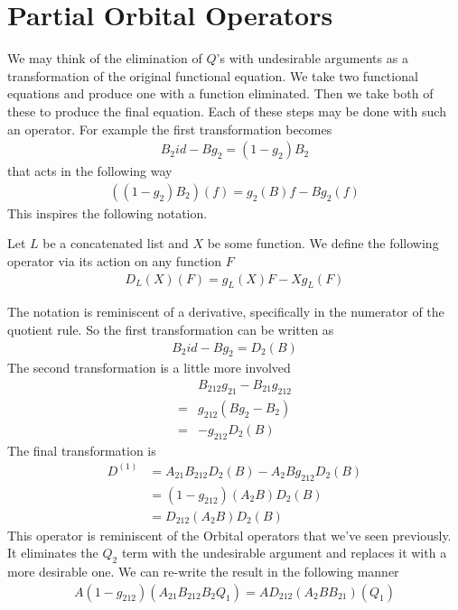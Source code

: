 \section{Partial Orbital Operators}
We may think of the elimination of $Q$'s with undesirable arguments as a transformation of the original functional equation. We take two functional equations and produce one with a function eliminated. Then we take both of these to produce the final equation. Each of these steps may be done with such an operator. For example the first transformation becomes
\begin{align}
	B_2 id - B g_2 = (1-g_2)B_2
\end{align}
that acts in the following way
\begin{align}
	 ((1-g_2)B_2)(f) = g_2(B)f - B g_2(f)
\end{align}
This inspires the following notation.
\begin{definition} Let $L$ be a concatenated list and $X$ be some function. We define the following operator via its action on any function $F$
\begin{align}
	D_L(X)(F) = g_L(X) F - X g_L(F)
\end{align}
\end{definition}
The notation is reminiscent of a derivative, specifically in the numerator of the quotient rule. So the first transformation can be written as
\begin{align}
	B_2 id - B g_2 = D_2(B)
\end{align}
The second transformation is a little more involved
\begin{align}
	& B_{212} g_{21} - B_{21} g_{212}\\
	=& g_{212}(B g_{2} - B_{2})\\
	=& -g_{212}D_2(B)
\end{align}
The final transformation is
\begin{align}
	D^{(1)} &= A_{21}B_{212} D_2(B) - A_2 B g_{212} D_2(B)\\
	&= (1-g_{212})(A_2 B)D_2(B)\\
	&= D_{212}(A_2B) D_2(B)
\end{align}
This operator is reminiscent of the Orbital operators that we've seen previously. It eliminates the $Q_2$ term with the undesirable argument and replaces it with a more desirable one. We can re-write the result in the following manner
\begin{align}
 A (1-g_{212})(A_{21}B_{212} B_2 Q_1)= A D_{212}( A_2 B B_{21}) (Q_1)
\end{align}
